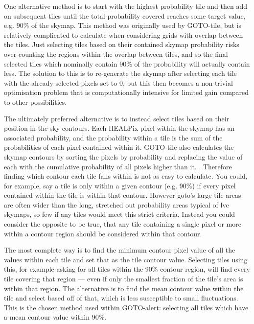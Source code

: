\begin{colsection}
\begin{colsection}
One alternative method is to start with the highest probability tile and then add on subsequent tiles until the total probability covered reaches some target value, e.g. 90\% of the skymap. This method was originally used by GOTO-tile, but is relatively complicated to calculate when considering grids with overlap between the tiles. Just selecting tiles based on their contained skymap probability risks over-counting the regions within the overlap between tiles, and so the final selected tiles which nominally contain 90\% of the probability will actually contain less. The solution to this is to re-generate the skymap after selecting each tile with the already-selected pixels set to 0, but this then becomes a non-trivial optimisation problem that is computationally intensive for limited gain compared to other possibilities.

The ultimately preferred alternative is to instead select tiles based on their position in the sky contours. Each HEALPix pixel within the skymap has an associated probability, and the probability within a tile is the sum of the probabilities of each pixel contained within it. GOTO-tile also calculates the skymap contours by sorting the pixels by probability and replacing the value of each with the cumulative probability of all pixels higher than it. . Therefore finding which contour each tile falls within is not as easy to calculate. You could, for example, say a tile is only within a given contour (e.g. 90\%) if every pixel contained within the tile is within that contour. However \gls{goto}'s large tile areas are often wider than the long, stretched out probability areas typical of \gls{lvc} skymaps, so few if any tiles would meet this strict criteria. Instead you could consider the opposite to be true, that any tile containing a single pixel or more within a contour region should be considered within that contour.

The most complete way is to find the minimum contour pixel value of all the values within each tile and set that as the tile contour value. Selecting tiles using this, for example asking for all tiles within the 90\% contour region, will find every tile covering that region --- even if only the smallest fraction of the tile's area is within that region. The alternative is to find the mean contour value within the tile and select based off of that, which is less susceptible to small fluctuations. This is the chosen method used within GOTO-alert: selecting all tiles which have a mean contour value within 90\%.


\end{colsection}
\end{colsection}
